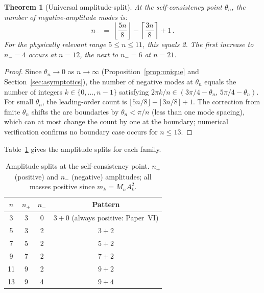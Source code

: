 \documentclass[11pt]{article}
\newtheorem{theorem}{Theorem}
\begin{document}
\begin{theorem}[Universal amplitude-split]
  \label{thm:split}
  At the self-consistency point $\theta_n$, the number of
  negative-amplitude modes is:
  \begin{equation}
    n_- \;=\; \left\lfloor \frac{5n}{8} \right\rfloor
            - \left\lceil \frac{3n}{8} \right\rceil + 1\,.
    \label{eq:n_minus}
  \end{equation}
  For the physically relevant range $5 \leq n \leq 11$, this equals 2.
  The first increase to $n_- = 4$ occurs at $n = 12$, the next to $n_- = 6$
  at $n = 21$.
\end{theorem}

\begin{proof}
  Since $\theta_n \to 0$ as $n \to \infty$ (Proposition~\ref{prop:unique}
  and Section~\ref{sec:asymptotics}), the number of negative modes at
  $\theta_n$ equals the number of integers $k \in \{0,\ldots,n-1\}$
  satisfying $2\pi k/n \in (3\pi/4 - \theta_n,\, 5\pi/4 - \theta_n)$.
  For small $\theta_n$, the leading-order count is
  $\lfloor 5n/8 \rfloor - \lceil 3n/8 \rceil + 1$.
  The correction from finite $\theta_n$ shifts the arc boundaries
  by $\theta_n < \pi/n$ (less than one mode spacing), which can at most
  change the count by one at the boundary; numerical verification confirms
  no boundary case occurs for $n \leq 13$.
\end{proof}

Table~\ref{tab:split} gives the amplitude splits for each family.

\begin{table}[ht]
  \caption{Amplitude splits at the self-consistency point. $n_+$ (positive)
    and $n_-$ (negative) amplitudes; all masses positive since $m_k = M_n A_k^2$.}
  \label{tab:split}
  \begin{tabular}{cccc}
    \toprule
    $n$ & $n_+$ & $n_-$ & Pattern \\
    \midrule
    3  & 3 & 0 & $3 + 0$ (always positive: Paper~VI) \\
    5  & 3 & 2 & $3 + 2$ \\
    7  & 5 & 2 & $5 + 2$ \\
    9  & 7 & 2 & $7 + 2$ \\
    11 & 9 & 2 & $9 + 2$ \\
    13 & 9 & 4 & $9 + 4$ \\
    \bottomrule
  \end{tabular}
\end{table}
\end{document}
